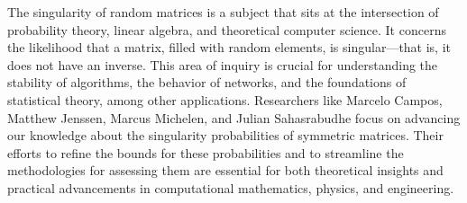 The singularity of random matrices is a subject that sits at the intersection of probability theory, linear algebra, and theoretical computer science. It concerns the likelihood that a matrix, filled with random elements, is singular—that is, it does not have an inverse. This area of inquiry is crucial for understanding the stability of algorithms, the behavior of networks, and the foundations of statistical theory, among other applications. Researchers like Marcelo Campos, Matthew Jenssen, Marcus Michelen, and Julian Sahasrabudhe focus on advancing our knowledge about the singularity probabilities of symmetric matrices. Their efforts to refine the bounds for these probabilities and to streamline the methodologies for assessing them are essential for both theoretical insights and practical advancements in computational mathematics, physics, and engineering.\\\\
